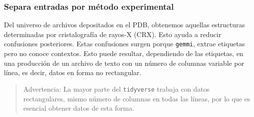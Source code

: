 \documentclass[
]{book}
\begin{document}
\hypertarget{separa-entradas-por-muxe9todo-experimental}{%
\subsubsection{Separa entradas por método experimental}\label{separa-entradas-por-muxe9todo-experimental}}

Del universo de archivos depositados en el PDB, obtenemos aquellas estructuras determinadas por cristalografía de rayos-X (CRX). Esto ayuda a reducir confusiones posteriores. Estas confusiones surgen porque \texttt{gemmi}, extrae etiquetas pero no conoce contextos. Esto puede resultar, dependiendo de las etiquetas, en una producción de un archivo de texto con un número de columnas variable por línea, es decir, datos en forma no rectangular.

\begin{quote}
Advertencia: La mayor parte del \texttt{tidyverse} trabaja con datos rectangulares, mismo número de columnas en todas las líneas, por lo que es esencial obtener datos de esta forma.
\end{quote}
\end{document}
